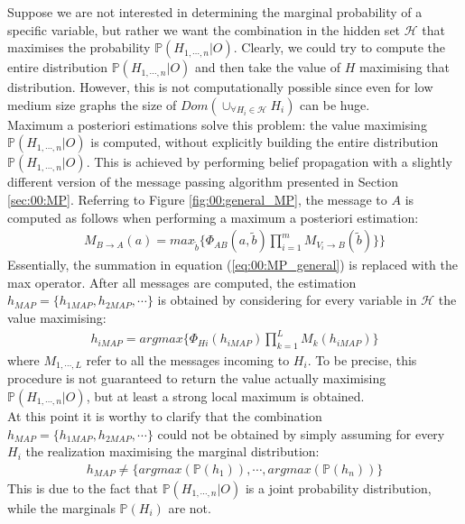 Suppose we are not interested in determining the marginal probability of a specific variable, but rather we want the combination in the hidden set $\mathcal{H}$ that maximises the probability $\mathbb{P}(H_{1, \cdots ,n} | O)$. Clearly, we could try to compute the entire distribution $\mathbb{P}(H_{1, \cdots ,n} | O)$ and then take the value of $H$ maximising that distribution. However, this is not computationally possible since even for low medium size graphs the size of $Dom(\cup _{\forall H_i \in \mathcal{H}} H_i)$ can be huge.
\\
Maximum a posteriori estimations solve this problem: the value maximising $\mathbb{P}(H_{1, \cdots ,n} | O)$ is computed, without explicitly building the entire distribution $\mathbb{P}(H_{1, \cdots ,n} | O)$. This is achieved by performing belief propagation with a slightly different version of the message  passing algorithm presented in Section \ref{sec:00:MP}. Referring to Figure \ref{fig:00:general_MP}, the message to $A$ is computed as follows when performing a maximum a posteriori estimation:
\begin{eqnarray}
M _{B \rightarrow A}(a) = 
max _{\tilde{b}} \lbrace \Phi_{AB}(a, \tilde{b}) \prod_{i=1}^{m} M_{V_i \rightarrow B}(\tilde{b}) \rbrace
\rbrace
\end{eqnarray}
Essentially, the summation in equation (\ref{eq:00:MP_general}) is replaced with the max operator.
After all messages are computed, the estimation $h_{MAP} = \lbrace h_{1MAP}, h_{2MAP}, \cdots \rbrace$ is obtained by considering for every variable in $\mathcal{H}$ the value maximising:
\begin{eqnarray}
h_{iMAP} = argmax \lbrace  \Phi _{Hi}(h_{iMAP})
\prod_{k=1}^{L} M_k(h_{iMAP})
\rbrace
\end{eqnarray}
where $M_{1,\cdots,L}$ refer to all the messages incoming to $H_i$. To be precise, this procedure is not guaranteed to return the value actually maximising $\mathbb{P}(H_{1, \cdots ,n} | O)$, but at least a strong local maximum is obtained.
\\
At this point it is worthy to clarify that the combination $h_{MAP} = \lbrace h_{1MAP}, h_{2MAP}, \cdots \rbrace$ could not be obtained by simply assuming for every $H_i$ the realization maximising the marginal distribution:
\begin{eqnarray}
h_{MAP} \neq \lbrace argmax(\mathbb{P}(h_1)) , \cdots , argmax(\mathbb{P}(h_n)) \rbrace
\end{eqnarray} 
This is due to the fact that $\mathbb{P}(H_{1, \cdots ,n} | O)$ is a joint probability distribution, while the marginals $\mathbb{P}(H_i)$ are not.
